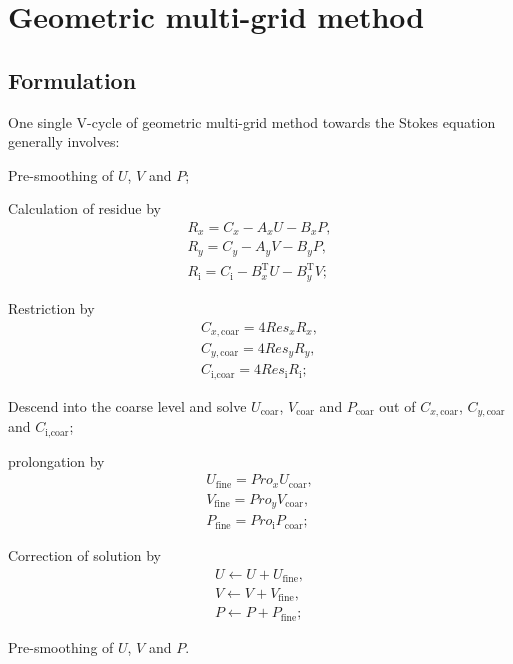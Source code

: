 \documentclass[english, nochinese]{pnote}
\begin{document}
\section{Geometric multi-grid method}

\subsection{Formulation}

One single V-cycle of geometric multi-grid method towards the Stokes equation generally involves:
\begin{partlist}
\item Pre-smoothing of $U$, $V$ and $P$;
\item Calculation of residue by
\begin{gather}
R_x = C_x - A_x U - B_x P, \\
R_y = C_y - A_y V - B_y P, \\
R_{\text{i}} = C_{\text{i}} - B_x^{\text{T}} U - B_y^{\text{T}} V;
\end{gather}
\item Restriction by
\begin{gather}
C_{ x, \text{coar} } = 4 \mathit{Res}_x R_x, \\
C_{ y, \text{coar} } = 4 \mathit{Res}_y R_y, \\
C_{ \text{i}, \text{coar} } = 4 \mathit{Res}_{\text{i}} R_{\text{i}};
\end{gather}
\item Descend into the coarse level and solve $U_{\text{coar}}$, $V_{\text{coar}}$ and $P_{\text{coar}}$ out of $ C_{ x, \text{coar} } $, $ C_{ y, \text{coar} } $ and $ C_{ \text{i}, \text{coar} } $;
\item prolongation by
\begin{gather}
U_{\text{fine}} = \mathit{Pro}_x U_{\text{coar}}, \\
V_{\text{fine}} = \mathit{Pro}_y V_{\text{coar}}, \\
P_{\text{fine}} = \mathit{Pro}_{\text{i}} P_{\text{coar}};
\end{gather}
\item Correction of solution by
\begin{gather}
U \leftarrow U + U_{\text{fine}}, \\
V \leftarrow V + V_{\text{fine}}, \\
P \leftarrow P + P_{\text{fine}};
\end{gather}
\item Pre-smoothing of $U$, $V$ and $P$.
\end{partlist}
\end{document}

